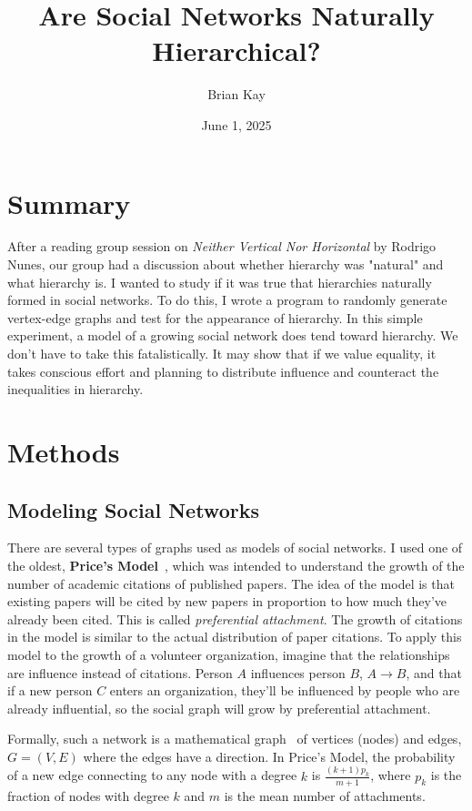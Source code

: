 \documentclass[12pt]{article}
\title{Are Social Networks Naturally Hierarchical?}
\date{June 1, 2025}
\author{Brian Kay}
\begin{document}
\maketitle

\section{Summary}
After a reading group session on \textit{Neither Vertical Nor Horizontal} by Rodrigo Nunes, our group had a discussion about
whether hierarchy was "natural" and what hierarchy is. I wanted to study if it was true that hierarchies naturally
formed in social networks. To do this, I wrote a program to randomly generate vertex-edge graphs and test for the
appearance of hierarchy. In this simple experiment, a model of a growing social network does
tend toward hierarchy. We don't have to take this fatalistically. It may show that if we value equality, it takes
conscious effort and planning to distribute influence and counteract the inequalities in hierarchy.

\section{Methods}

\subsection{Modeling Social Networks}

There are several types of graphs used as
models of social networks. I used one of the oldest, \textbf{Price's Model}~\cite{wikipediaPricesModel},
which was intended to understand the growth of
the number of academic citations of published papers. The idea of the model is that existing papers will be cited by new
papers in proportion to how much they've already been cited. This is called \textit{preferential attachment}.
The growth of citations in the model is similar to the
actual distribution of paper citations. To apply this model to the growth of a volunteer organization, imagine
that the relationships are influence instead of citations.
Person $A$ influences person $B$, $A \rightarrow B$, and that if a new person $C$ enters an organization, they'll be influenced by
people who are already influential, so the social graph will grow by preferential attachment.

Formally, such a network is a mathematical graph~\cite{wikipediaGraphTheory} of vertices (nodes) and edges, $G=(V,E)$ where the edges have a direction.
In Price's Model, the probability of a new edge connecting to any node with a degree $k$ is $\frac{(k + 1) p_k}{m + 1}$,
where $p_k$ is the fraction of nodes with degree $k$ and $m$ is the mean number of
attachments.
\end{document}
